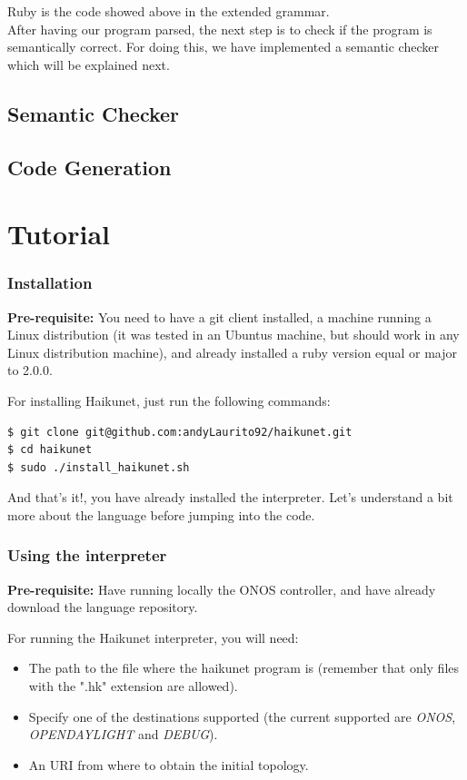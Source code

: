 Ruby is the code showed above in the extended grammar.\\
After having our program parsed, the next step is to check if the program is semantically correct. For doing this, we have implemented a semantic checker which will be explained next. 

\subsection{Semantic Checker}

\subsection{Code Generation}

\section{Tutorial}

\subsubsection{Installation}

\textbf{Pre-requisite:} You need to have a git client installed, a machine running a Linux distribution (it was tested in an Ubuntus machine, but should work in any Linux distribution machine), and already installed a ruby version equal or major to 2.0.0.

For installing Haikunet, just run the following commands:

\begin{lstlisting}[language=bash,breaklines=true]
$ git clone git@github.com:andyLaurito92/haikunet.git
$ cd haikunet
$ sudo ./install_haikunet.sh 
\end{lstlisting}

And that's it!, you have already installed the interpreter. Let's understand a bit more about the language before jumping into the code.

\subsubsection{Using the interpreter}

\textbf{Pre-requisite:} Have running locally the ONOS controller, and have already download the language repository.

For running the Haikunet interpreter, you will need: 
\begin{itemize}
\item The path to the file where the haikunet program is (remember that only files with the ".hk" extension are allowed).
\item Specify one of the destinations supported (the current supported are \textit{ONOS}, \textit{OPENDAYLIGHT} and \textit{DEBUG}).
\item An URI from where to obtain the initial topology.
\end{itemize}

